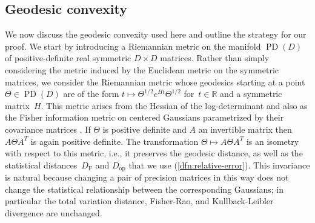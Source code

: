 \documentclass[aos]{imsart}
\theoremstyle{definition}
\numberwithin{equation}{section}
\DeclareMathOperator{\PD}{PD}
\newcommand{\R}{{\mathbb{R}}}
\newcommand{\DF}{D_{\operatorname{F}}}
\newcommand{\Dop}{D_{\operatorname{op}}}
\begin{document}
\subsection{Geodesic convexity}\label{subsec:geom}
We now discuss the geodesic convexity used here and outline the strategy for our proof.
We start by introducing a Riemannian metric on the manifold $\PD(D)$ of positive-definite real symmetric $D\times D$ matrices.
Rather than simply considering the metric induced by the Euclidean metric on the symmetric matrices, we consider the Riemannian metric whose geodesics starting at a point $\Theta \in \PD(D)$ are of the form $t \mapsto \Theta^{1/2} e^{Ht} \Theta^{1/2}$ for~$t \in \R$ and a symmetric matrix~$H$.
This metric arises from the Hessian of the log-determinant \citep{bhatia2009positive} and also as the Fisher information metric on centered Gaussians parametrized by their covariance matrices \citep{skovgaard1984riemannian}.
If $\Theta$ is positive definite and $A$ an invertible matrix then $A\Theta A^T$ is again  positive definite.
The transformation $\Theta \mapsto A\Theta A^T$ is an isometry with respect to this metric, i.e., it preserves the geodesic distance, as well as the statistical distances~$\DF$ and $\Dop$ that we use (\cref{dfn:relative-error}).
This invariance is natural because changing a pair of precision matrices in this way does not change the statistical relationship between the corresponding Gaussians; in particular the total variation distance, Fisher-Rao, and Kullback-Leibler divergence are unchanged.
\end{document}
